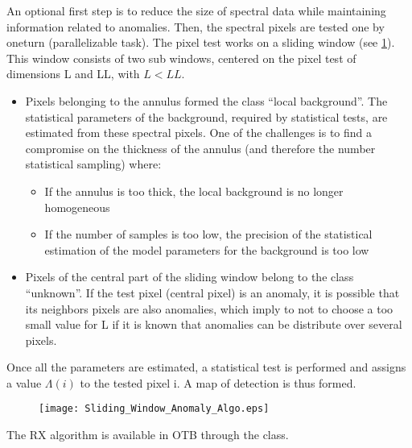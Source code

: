 An optional first step is to reduce the size of spectral data
while maintaining information related to anomalies. Then, the spectral pixels
are tested one by oneturn (parallelizable task). The pixel
test works on a sliding window (see \ref{fig:sliding_anomaly}). This
window consists of two sub windows, centered on the pixel test of  dimensions L and LL, with $L<LL$.

\begin{itemize}
\item Pixels belonging to the annulus formed the class ``local background''. The statistical parameters of the background,
  required by statistical tests, are estimated from these
  spectral pixels. One of the challenges is to find a
  compromise on the thickness of the annulus (and therefore the number
  statistical sampling) where:
 
\begin{itemize}
\item If the annulus is too thick, the local background  is no longer homogeneous
\item If the number of samples is too low, the precision of
  the statistical estimation of the model parameters for the background is too
  low
\end{itemize}  
\item Pixels of the central part of the sliding window
  belong to the class ``unknown''. If the test pixel (central pixel) is an anomaly, it is possible that its neighbors
  pixels are also anomalies, which imply to not to choose
  a too small value for L if it is known that anomalies
  can be distribute over several pixels.
\end{itemize}  
Once all the parameters are estimated, a statistical test is performed and assigns a
value $\Lambda(i)$ to the tested pixel i. A map of detection is thus
formed.

\begin{figure}[h]
  \centering
  \texttt{[image: Sliding\_Window\_Anomaly\_Algo.eps]}
  \label{fig:sliding_anomaly}
\end{figure}

The RX algorithm is available in OTB through the  class.

